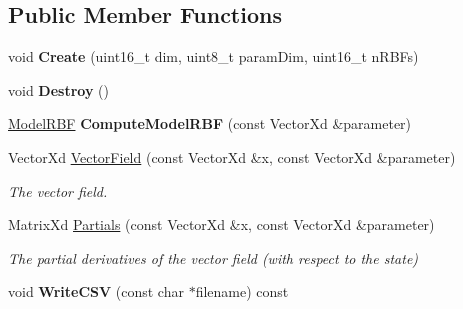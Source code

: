 \subsection*{Public Member Functions}
\begin{DoxyCompactItemize}
\item 
\hypertarget{struct_d_r_d_s_p_1_1_model_reduced_a630dfd8ee437ac00762db55a59fd8e05}{void {\bfseries Create} (uint16\-\_\-t dim, uint8\-\_\-t param\-Dim, uint16\-\_\-t n\-R\-B\-Fs)}\label{struct_d_r_d_s_p_1_1_model_reduced_a630dfd8ee437ac00762db55a59fd8e05}

\item 
\hypertarget{struct_d_r_d_s_p_1_1_model_reduced_a0cf3cf3e2dc9b7e9f905387bdd5ee941}{void {\bfseries Destroy} ()}\label{struct_d_r_d_s_p_1_1_model_reduced_a0cf3cf3e2dc9b7e9f905387bdd5ee941}

\item 
\hypertarget{struct_d_r_d_s_p_1_1_model_reduced_accd8ad44819268f2d49aeb426b4439c2}{\hyperlink{struct_d_r_d_s_p_1_1_model_r_b_f}{Model\-R\-B\-F} {\bfseries Compute\-Model\-R\-B\-F} (const Vector\-Xd \&parameter)}\label{struct_d_r_d_s_p_1_1_model_reduced_accd8ad44819268f2d49aeb426b4439c2}

\item 
\hypertarget{struct_d_r_d_s_p_1_1_model_reduced_a3e4dde2aa65d53f6033c0248bafab699}{Vector\-Xd \hyperlink{struct_d_r_d_s_p_1_1_model_reduced_a3e4dde2aa65d53f6033c0248bafab699}{Vector\-Field} (const Vector\-Xd \&x, const Vector\-Xd \&parameter)}\label{struct_d_r_d_s_p_1_1_model_reduced_a3e4dde2aa65d53f6033c0248bafab699}

\begin{DoxyCompactList}\small\item\em The vector field. \end{DoxyCompactList}\item 
\hypertarget{struct_d_r_d_s_p_1_1_model_reduced_a3ae282852370f25a33b346beb3ba2751}{Matrix\-Xd \hyperlink{struct_d_r_d_s_p_1_1_model_reduced_a3ae282852370f25a33b346beb3ba2751}{Partials} (const Vector\-Xd \&x, const Vector\-Xd \&parameter)}\label{struct_d_r_d_s_p_1_1_model_reduced_a3ae282852370f25a33b346beb3ba2751}

\begin{DoxyCompactList}\small\item\em The partial derivatives of the vector field (with respect to the state) \end{DoxyCompactList}\item 
\hypertarget{struct_d_r_d_s_p_1_1_model_reduced_a3da2cd9ed93e71e44c00718e49ec4d2a}{void {\bfseries Write\-C\-S\-V} (const char $\ast$filename) const }\label{struct_d_r_d_s_p_1_1_model_reduced_a3da2cd9ed93e71e44c00718e49ec4d2a}

\end{DoxyCompactItemize}
